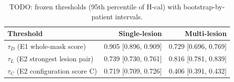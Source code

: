 \begin{table}
\centering
\small
\begin{tabular}{lrr}
\toprule
Threshold & Single-lesion & Multi-lesion \\
\midrule
$\tau_D$ (E1 whole-mask score) & 0.905 [0.896, 0.909] & 0.729 [0.696, 0.769] \\
$\tau_L$ (E2 strongest lesion pair) & 0.739 [0.730, 0.761] & 0.816 [0.781, 0.839] \\
$\tau_C$ (E2 configuration score C) & 0.719 [0.709, 0.726] & 0.406 [0.391, 0.432] \\
\bottomrule
\end{tabular}
\caption{TODO: frozen thresholds (95th percentile of H-cal) with bootstrap-by-patient intervals.}
\label{tab:thresholds}
\end{table}
